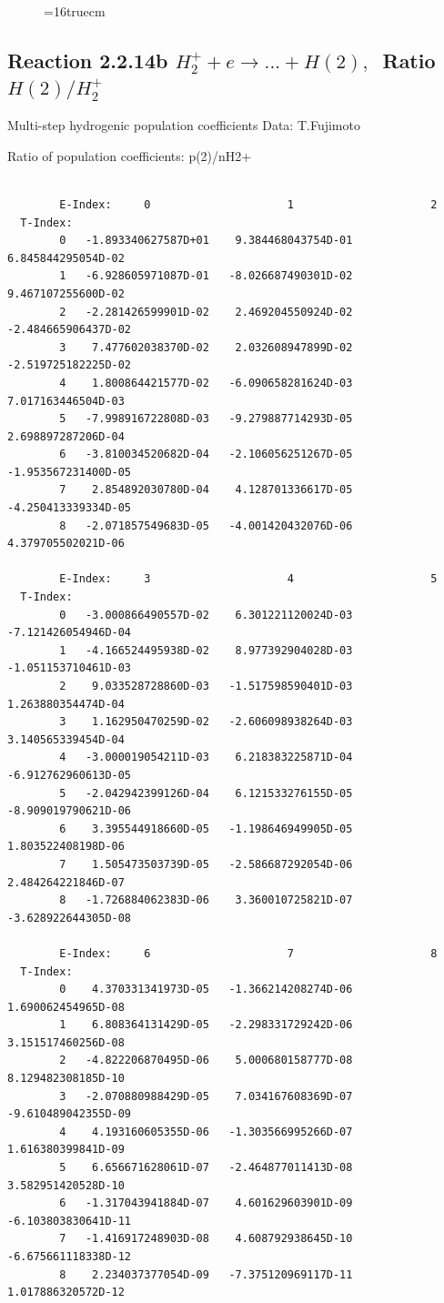 \documentclass[12pt,dvips]{article}
\begin{document}
\begin{figure} \label{2.2.14a}
\epsfxsize=16truecm
\end{figure}
\newpage

\subsection{
Reaction 2.2.14b $ H_2^+ + e \rightarrow ...+ H(2) , \   $
Ratio $H(2)/H_2^+  $
}

 Multi-step hydrogenic population coefficients
 Data: T.Fujimoto

 Ratio of population coefficients: p(2)/nH2+

\begin{small}\begin{verbatim}

        E-Index:     0                     1                     2
  T-Index:
        0   -1.893340627587D+01    9.384468043754D-01    6.845844295054D-02
        1   -6.928605971087D-01   -8.026687490301D-02    9.467107255600D-02
        2   -2.281426599901D-02    2.469204550924D-02   -2.484665906437D-02
        3    7.477602038370D-02    2.032608947899D-02   -2.519725182225D-02
        4    1.800864421577D-02   -6.090658281624D-03    7.017163446504D-03
        5   -7.998916722808D-03   -9.279887714293D-05    2.698897287206D-04
        6   -3.810034520682D-04   -2.106056251267D-05   -1.953567231400D-05
        7    2.854892030780D-04    4.128701336617D-05   -4.250413339334D-05
        8   -2.071857549683D-05   -4.001420432076D-06    4.379705502021D-06

        E-Index:     3                     4                     5
  T-Index:
        0   -3.000866490557D-02    6.301221120024D-03   -7.121426054946D-04
        1   -4.166524495938D-02    8.977392904028D-03   -1.051153710461D-03
        2    9.033528728860D-03   -1.517598590401D-03    1.263880354474D-04
        3    1.162950470259D-02   -2.606098938264D-03    3.140565339454D-04
        4   -3.000019054211D-03    6.218383225871D-04   -6.912762960613D-05
        5   -2.042942399126D-04    6.121533276155D-05   -8.909019790621D-06
        6    3.395544918660D-05   -1.198646949905D-05    1.803522408198D-06
        7    1.505473503739D-05   -2.586687292054D-06    2.484264221846D-07
        8   -1.726884062383D-06    3.360010725821D-07   -3.628922644305D-08

        E-Index:     6                     7                     8
  T-Index:
        0    4.370331341973D-05   -1.366214208274D-06    1.690062454965D-08
        1    6.808364131429D-05   -2.298331729242D-06    3.151517460256D-08
        2   -4.822206870495D-06    5.000680158777D-08    8.129482308185D-10
        3   -2.070880988429D-05    7.034167608369D-07   -9.610489042355D-09
        4    4.193160605355D-06   -1.303566995266D-07    1.616380399841D-09
        5    6.656671628061D-07   -2.464877011413D-08    3.582951420528D-10
        6   -1.317043941884D-07    4.601629603901D-09   -6.103803830641D-11
        7   -1.416917248903D-08    4.608792938645D-10   -6.675661118338D-12
        8    2.234037377054D-09   -7.375120969117D-11    1.017886320572D-12


\end{verbatim}
\end{small}
\end{document}
